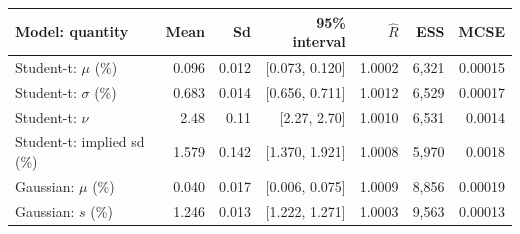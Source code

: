 \begin{tabular}{lrrrrrr}
\toprule
Model: quantity & Mean & Sd & 95\% interval & $\hat R$ & ESS & MCSE \\
\midrule
Student-t: $\mu$ (\%) & 0.096 & 0.012 & [0.073, 0.120] & 1.0002 & 6,321 & 0.00015 \\
Student-t: $\sigma$ (\%) & 0.683 & 0.014 & [0.656, 0.711] & 1.0012 & 6,529 & 0.00017 \\
Student-t: $\nu$ & 2.48 & 0.11 & [2.27, 2.70] & 1.0010 & 6,531 & 0.0014 \\
Student-t: implied sd (\%) & 1.579 & 0.142 & [1.370, 1.921] & 1.0008 & 5,970 & 0.0018 \\
Gaussian: $\mu$ (\%) & 0.040 & 0.017 & [0.006, 0.075] & 1.0009 & 8,856 & 0.00019 \\
Gaussian: $s$ (\%) & 1.246 & 0.013 & [1.222, 1.271] & 1.0003 & 9,563 & 0.00013 \\
\bottomrule
\end{tabular}
